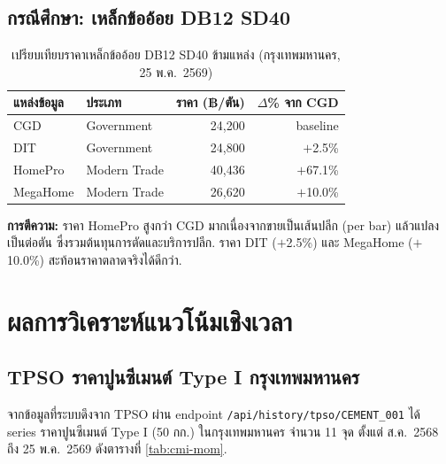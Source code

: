 \subsection{กรณีศึกษา: เหล็กข้ออ้อย DB12 SD40}

\begin{table}[H]
\centering
\caption{เปรียบเทียบราคาเหล็กข้ออ้อย DB12 SD40 ข้ามแหล่ง (กรุงเทพมหานคร, 25 พ.ค.\ 2569)}
\label{tab:rebar-compare}
\begin{tabularx}{\textwidth}{l X r r}
\toprule
\textbf{แหล่งข้อมูล} & \textbf{ประเภท} & \textbf{ราคา (฿/ตัน)} & \textbf{$\Delta$\% จาก CGD} \\
\midrule
CGD         & Government   & 24{,}200 & baseline \\
DIT         & Government   & 24{,}800 & $+$2.5\% \\
HomePro     & Modern Trade & 40{,}436 & $+$67.1\% \\
MegaHome    & Modern Trade & 26{,}620 & $+$10.0\% \\
\bottomrule
\end{tabularx}
\end{table}

\textbf{การตีความ:} ราคา HomePro สูงกว่า CGD มากเนื่องจากขายเป็นเส้นปลีก (per bar) แล้วแปลงเป็นต่อตัน ซึ่งรวมต้นทุนการตัดและบริการปลีก. ราคา DIT ($+$2.5\%) และ MegaHome ($+$10.0\%) สะท้อนราคาตลาดจริงได้ดีกว่า.

\section{ผลการวิเคราะห์แนวโน้มเชิงเวลา}
\label{sec:trend-result}

\subsection{TPSO ราคาปูนซีเมนต์ Type I กรุงเทพมหานคร}

จากข้อมูลที่ระบบดึงจาก TPSO ผ่าน endpoint \texttt{/api/history/tpso/CEMENT\_001}
ได้ series ราคาปูนซีเมนต์ Type I (50 กก.) ในกรุงเทพมหานคร จำนวน 11 จุด
ตั้งแต่ ส.ค.\ 2568 ถึง 25 พ.ค.\ 2569 ดังตารางที่ \ref{tab:cmi-mom}.

